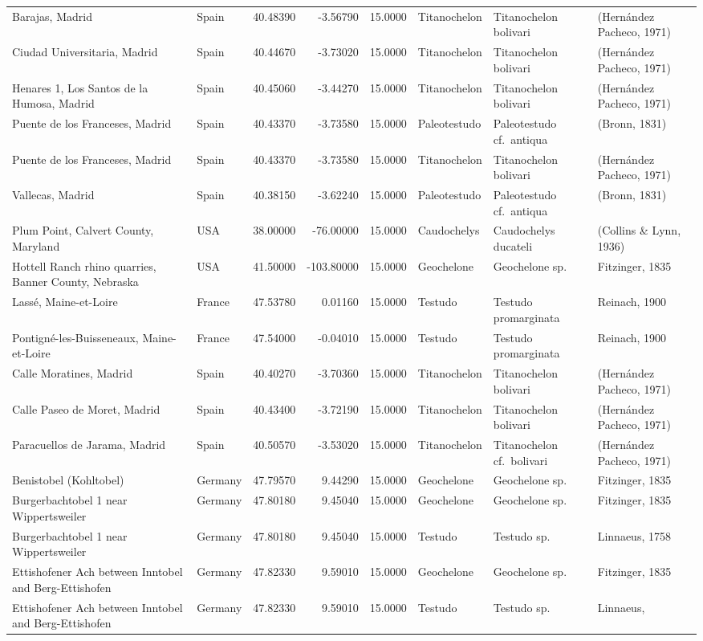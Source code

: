 \documentclass[]{article}
\begin{document}
\begin{longtable}[]{@{}llrrrlll@{}}
Barajas, Madrid & Spain & 40.48390 & -3.56790 & 15.0000 & Titanochelon &
Titanochelon bolivari & (Hernández Pacheco, 1971)\tabularnewline
Ciudad Universitaria, Madrid & Spain & 40.44670 & -3.73020 & 15.0000 &
Titanochelon & Titanochelon bolivari & (Hernández Pacheco,
1971)\tabularnewline
Henares 1, Los Santos de la Humosa, Madrid & Spain & 40.45060 & -3.44270
& 15.0000 & Titanochelon & Titanochelon bolivari & (Hernández Pacheco,
1971)\tabularnewline
Puente de los Franceses, Madrid & Spain & 40.43370 & -3.73580 & 15.0000
& Paleotestudo & Paleotestudo cf.~antiqua & (Bronn, 1831)\tabularnewline
Puente de los Franceses, Madrid & Spain & 40.43370 & -3.73580 & 15.0000
& Titanochelon & Titanochelon bolivari & (Hernández Pacheco,
1971)\tabularnewline
Vallecas, Madrid & Spain & 40.38150 & -3.62240 & 15.0000 & Paleotestudo
& Paleotestudo cf.~antiqua & (Bronn, 1831)\tabularnewline
Plum Point, Calvert County, Maryland & USA & 38.00000 & -76.00000 &
15.0000 & Caudochelys & Caudochelys ducateli & (Collins \& Lynn,
1936)\tabularnewline
Hottell Ranch rhino quarries, Banner County, Nebraska & USA & 41.50000 &
-103.80000 & 15.0000 & Geochelone & Geochelone sp. & Fitzinger,
1835\tabularnewline
Lassé, Maine-et-Loire & France & 47.53780 & 0.01160 & 15.0000 & Testudo
& Testudo promarginata & Reinach, 1900\tabularnewline
Pontigné-les-Buisseneaux, Maine-et-Loire & France & 47.54000 & -0.04010
& 15.0000 & Testudo & Testudo promarginata & Reinach,
1900\tabularnewline
Calle Moratines, Madrid & Spain & 40.40270 & -3.70360 & 15.0000 &
Titanochelon & Titanochelon bolivari & (Hernández Pacheco,
1971)\tabularnewline
Calle Paseo de Moret, Madrid & Spain & 40.43400 & -3.72190 & 15.0000 &
Titanochelon & Titanochelon bolivari & (Hernández Pacheco,
1971)\tabularnewline
Paracuellos de Jarama, Madrid & Spain & 40.50570 & -3.53020 & 15.0000 &
Titanochelon & Titanochelon cf.~bolivari & (Hernández Pacheco,
1971)\tabularnewline
Benistobel (Kohltobel) & Germany & 47.79570 & 9.44290 & 15.0000 &
Geochelone & Geochelone sp. & Fitzinger, 1835\tabularnewline
Burgerbachtobel 1 near Wippertsweiler & Germany & 47.80180 & 9.45040 &
15.0000 & Geochelone & Geochelone sp. & Fitzinger, 1835\tabularnewline
Burgerbachtobel 1 near Wippertsweiler & Germany & 47.80180 & 9.45040 &
15.0000 & Testudo & Testudo sp. & Linnaeus, 1758\tabularnewline
Ettishofener Ach between Inntobel and Berg-Ettishofen & Germany &
47.82330 & 9.59010 & 15.0000 & Geochelone & Geochelone sp. & Fitzinger,
1835\tabularnewline
Ettishofener Ach between Inntobel and Berg-Ettishofen & Germany &
47.82330 & 9.59010 & 15.0000 & Testudo & Testudo sp. & Linnaeus,

\end{longtable}
\end{document}

